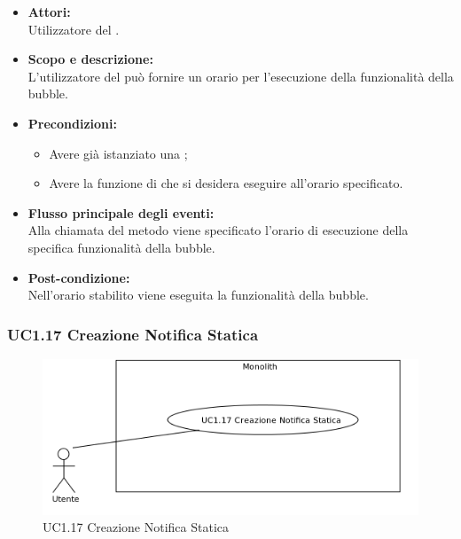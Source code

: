 \begin{itemize}
	\item \textbf{Attori:}
	\\Utilizzatore del .
	\item \textbf{Scopo e descrizione:} 
	\\L’utilizzatore del  può fornire un orario per l’esecuzione della funzionalità della bubble.
	\item \textbf{Precondizioni:}
	\begin{itemize}
		\item Avere già istanziato una ;
		\item Avere la funzione di  che si desidera eseguire all’orario specificato.
	\end{itemize}
	\item \textbf{Flusso principale degli eventi:}
	\\Alla chiamata del metodo viene specificato l’orario di esecuzione della specifica funzionalità della bubble.
	\item \textbf{Post-condizione:}
	\\Nell’orario stabilito viene eseguita la funzionalità della bubble.
\end{itemize}

\subsubsection{UC1.17 Creazione Notifica Statica} \label{UC1.17}

\begin{figure}[H]
	\centering
	\includegraphics[width=15cm]{../../documenti/AnalisiDeiRequisiti/Diagrammi_img/uc1_17.png}
	\caption{UC1.17 Creazione Notifica Statica}
\end{figure}

